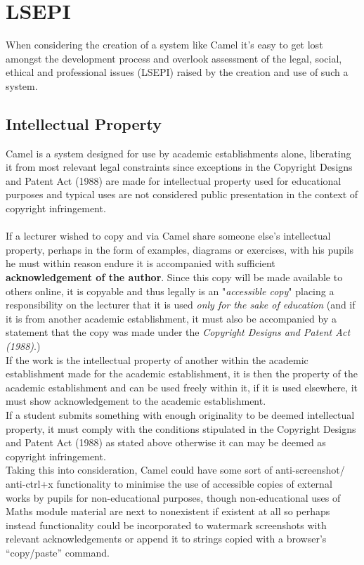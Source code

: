 \newpage
\section{LSEPI}
    When considering the creation of a system like Camel it’s easy to get lost amongst the development process and overlook assessment of the legal, social, ethical and professional issues (LSEPI) raised by the creation and use of such a system.
\subsection*{Intellectual Property}
Camel is a system designed for use by academic establishments alone, liberating it from most relevant legal constraints since exceptions in the Copyright Designs and Patent Act (1988) are made for intellectual property used for educational purposes and typical uses are not considered public presentation in the context of copyright infringement.
\\\\If a lecturer wished to copy and via Camel share someone else's intellectual property, perhaps in the form of examples, diagrams or exercises, with his pupils he must within reason endure it is accompanied with sufficient \textbf{acknowledgement of the author}. Since this copy will be made available to others online, it is copyable and thus legally is an "\textit{accessible copy}" placing a responsibility on the lecturer that it is used \emph{only for the sake of education} (and if it is from another academic establishment, it must also be accompanied by a statement that the copy was made under the \textit{Copyright Designs and Patent Act (1988)}.\cite[(Pt 1, Ch 3, §31B)]{CDaPA})
\\If the work is the intellectual property of another within the academic establishment made for the academic establishment, it is then the property of the academic establishment and can be used freely within it, if it is used elsewhere, it must show acknowledgement to the academic establishment.
\\If a student submits something with enough originality to be deemed intellectual property, it must comply with the conditions stipulated in the Copyright Designs and Patent Act (1988) as stated above otherwise it can may be deemed as copyright infringement.
\\Taking this into consideration, Camel could have some sort of anti-screenshot/ anti-ctrl+x functionality to minimise the use of accessible copies of external works by pupils for non-educational purposes, though non-educational uses of Maths module material are next to nonexistent if existent at all so perhaps instead functionality could be incorporated to watermark screenshots with relevant acknowledgements or append it to strings copied with a browser’s “copy/paste” command.
